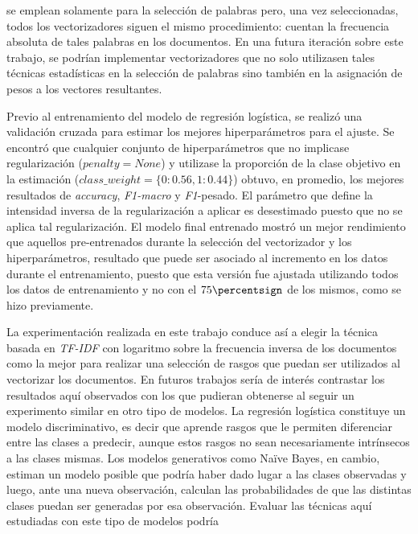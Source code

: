 \cite{monroe2008fightin} se emplean solamente
para la selecci\'on de palabras pero, una vez seleccionadas, todos
los vectorizadores siguen el mismo procedimiento: cuentan la frecuencia
absoluta de tales palabras en los documentos. En una futura iteraci\'on
sobre este trabajo, se podr\'ian implementar vectorizadores que
no solo utilizasen tales t\'ecnicas estad\'isticas en la selecci\'on
de palabras sino tambi\'en en la asignaci\'on de pesos a los vectores resultantes.
\par
Previo al entrenamiento del modelo de regresi\'on log\'istica, se
realiz\'o una validaci\'on cruzada para estimar los mejores hiperpar\'ametros
para el ajuste. Se encontr\'o que cualquier conjunto de hiperpar\'ametros
que no implicase regularizaci\'on ($penalty=None$) y utilizase
la proporci\'on de la clase objetivo en la estimaci\'on
($class\_weight=\lbrace0:0.56, 1:0.44\rbrace$) obtuvo, en promedio,
los mejores resultados de \textit{accuracy}, \textit{F1-macro} y \textit{F1}-pesado.
El par\'ametro que define
la intensidad inversa de la regularizaci\'on a aplicar es desestimado
puesto que no se aplica tal regularizaci\'on. El modelo final entrenado
mostr\'o un mejor rendimiento que aquellos pre-entrenados
durante la selecci\'on del vectorizador y los hiperpar\'ametros, resultado que
puede ser asociado al incremento en los datos durante el entrenamiento,
puesto que esta versi\'on fue ajustada utilizando todos los datos
de entrenamiento y no con el $75\percentsign$ de los mismos,
como se hizo previamente.
\par
La experimentaci\'on realizada en este trabajo conduce as\'i a elegir
la t\'ecnica basada en \textit{TF-IDF} con logaritmo sobre la
frecuencia inversa de los documentos como la mejor para
realizar una selecci\'on de rasgos que puedan ser utilizados al
vectorizar los documentos. En futuros trabajos ser\'ia de inter\'es
contrastar los resultados aqu\'i observados con los que pudieran obtenerse
al seguir un experimento similar en otro tipo de modelos.
La regresi\'on log\'istica constituye un modelo discriminativo, es decir
que aprende rasgos que le permiten diferenciar entre las clases
a predecir, aunque estos rasgos no sean necesariamente intr\'insecos
a las clases mismas. Los modelos generativos como Naïve Bayes, en cambio, estiman un
modelo posible que podr\'ia haber dado lugar a las clases observadas y
luego, ante una nueva observaci\'on, calculan las probabilidades de que
las distintas clases puedan ser generadas por esa observaci\'on.
Evaluar las t\'ecnicas aqu\'i estudiadas con este tipo de modelos podr\'ia
